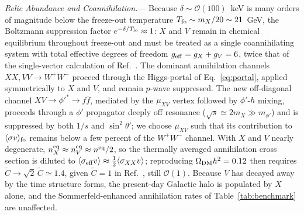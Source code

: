 \documentclass[aps,prl,twocolumn,superscriptaddress,nofootinbib]{revtex4-2}
\begin{document}
\textit{Relic Abundance and Coannihilation.}---%
Because $\delta\sim\mathcal{O}(100)$~keV is many orders of magnitude
below the freeze-out temperature $T_{\rm fo}\sim m_X/20\sim21$~GeV, the
Boltzmann suppression factor $e^{-\delta/T_{\rm fo}}\approx1$: $X$ and $V$
remain in chemical equilibrium throughout freeze-out and must be treated
as a single coannihilating system with total effective degrees of
freedom $g_{\rm eff}=g_X+g_V=6$, twice that of the single-vector
calculation of Ref.~\cite{Yamashita2026}. The dominant annihilation
channels $XX,VV\to W^+W^-$ proceed through the
Higgs-portal of Eq.~\eqref{eq:portal}, applied symmetrically to $X$
and $V$, and remain $p$-wave suppressed. The new off-diagonal channel
$XV\to\phi'^*\to f\bar f$, mediated by the $\mu_{XV}$ vertex followed by
$\phi'$-$h$ mixing, proceeds through a $\phi'$ propagator deeply off
resonance ($\sqrt s\simeq2m_X\gg m_{\phi'}$) and is suppressed by both
$1/s$ and $\sin^2\theta'$; we choose $\mu_{XV}$ such that its contribution
to $\langle\sigma v\rangle_{\rm fo}$ remains below a few percent of the
$W^+W^-$ channel. With $X$ and $V$ nearly degenerate,
$n_X^{\rm eq}\approx n_V^{\rm eq}\approx n^{\rm eq}/2$, so the
thermally averaged annihilation cross section is diluted to
$\langle\sigma_{\rm eff}v\rangle\approx\frac12\langle\sigma_{XX}v\rangle$;
reproducing $\Omega_{\rm DM}h^2=0.12$ then requires
$\tilde C\to\sqrt{2}\,\tilde C\simeq1.4$, given $\tilde C=1$ in
Ref.~\cite{Yamashita2026}, still $\mathcal{O}(1)$.
Because $V$ has decayed away by the time structure
forms, the present-day Galactic halo is populated by $X$ alone, and the
Sommerfeld-enhanced annihilation rates of Table~\ref{tab:benchmark} are
unaffected.
\end{document}
